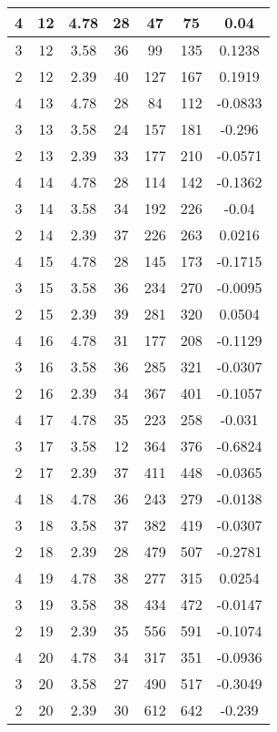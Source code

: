 \documentclass[letterpaper, 12pt]{article}
\begin{document}
\begin{longtable}{|c|c|c|c|c|c|c|}
\hline
4 & 12 & 4.78 & 28 & 47 & 75 & 0.04 \\
\hline
3 & 12 & 3.58 & 36 & 99 & 135 & 0.1238 \\
\hline
2 & 12 & 2.39 & 40 & 127 & 167 & 0.1919 \\
\hline
4 & 13 & 4.78 & 28 & 84 & 112 & -0.0833 \\
\hline
3 & 13 & 3.58 & 24 & 157 & 181 & -0.296 \\
\hline
2 & 13 & 2.39 & 33 & 177 & 210 & -0.0571 \\
\hline
4 & 14 & 4.78 & 28 & 114 & 142 & -0.1362 \\
\hline
3 & 14 & 3.58 & 34 & 192 & 226 & -0.04 \\
\hline
2 & 14 & 2.39 & 37 & 226 & 263 & 0.0216 \\
\hline
4 & 15 & 4.78 & 28 & 145 & 173 & -0.1715 \\
\hline
3 & 15 & 3.58 & 36 & 234 & 270 & -0.0095 \\
\hline
2 & 15 & 2.39 & 39 & 281 & 320 & 0.0504 \\
\hline
4 & 16 & 4.78 & 31 & 177 & 208 & -0.1129 \\
\hline
3 & 16 & 3.58 & 36 & 285 & 321 & -0.0307 \\
\hline
2 & 16 & 2.39 & 34 & 367 & 401 & -0.1057 \\
\hline
4 & 17 & 4.78 & 35 & 223 & 258 & -0.031 \\
\hline
3 & 17 & 3.58 & 12 & 364 & 376 & -0.6824 \\
\hline
2 & 17 & 2.39 & 37 & 411 & 448 & -0.0365 \\
\hline
4 & 18 & 4.78 & 36 & 243 & 279 & -0.0138 \\
\hline
3 & 18 & 3.58 & 37 & 382 & 419 & -0.0307 \\
\hline
2 & 18 & 2.39 & 28 & 479 & 507 & -0.2781 \\
\hline
4 & 19 & 4.78 & 38 & 277 & 315 & 0.0254 \\
\hline
3 & 19 & 3.58 & 38 & 434 & 472 & -0.0147 \\
\hline
2 & 19 & 2.39 & 35 & 556 & 591 & -0.1074 \\
\hline
4 & 20 & 4.78 & 34 & 317 & 351 & -0.0936 \\
\hline
3 & 20 & 3.58 & 27 & 490 & 517 & -0.3049 \\
\hline
2 & 20 & 2.39 & 30 & 612 & 642 & -0.239 \\
\hline
\end{longtable}
\end{document}
